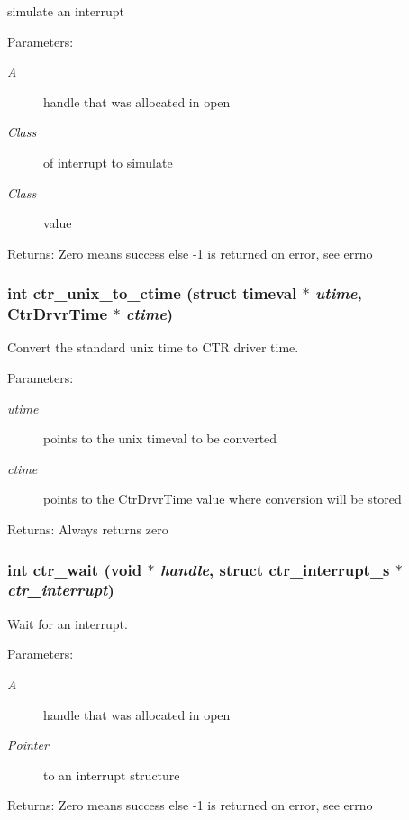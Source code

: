 simulate an interrupt 

\begin{Desc}
\item[Parameters:]
\begin{description}
\item[{\em A}]handle that was allocated in open \item[{\em Class}]of interrupt to simulate \item[{\em Class}]value \end{description}
\end{Desc}
\begin{Desc}
\item[Returns:]Zero means success else -1 is returned on error, see errno \end{Desc}
\subsubsection{\setlength{\rightskip}{0pt plus 5cm}int ctr\_\-unix\_\-to\_\-ctime (struct timeval $\ast$ {\em utime}, Ctr\-Drvr\-Time $\ast$ {\em ctime})}\label{libctr_8doxygen_4cd6c08e06ea1c80a47755499b22a18c}


Convert the standard unix time to CTR driver time. 

\begin{Desc}
\item[Parameters:]
\begin{description}
\item[{\em utime}]points to the unix timeval to be converted \item[{\em ctime}]points to the Ctr\-Drvr\-Time value where conversion will be stored \end{description}
\end{Desc}
\begin{Desc}
\item[Returns:]Always returns zero \end{Desc}
\subsubsection{\setlength{\rightskip}{0pt plus 5cm}int ctr\_\-wait (void $\ast$ {\em handle}, struct \bf{ctr\_\-interrupt\_\-s} $\ast$ {\em ctr\_\-interrupt})}\label{libctr_8doxygen_365202e6572dcba9c093375361a6a3da}


Wait for an interrupt. 

\begin{Desc}
\item[Parameters:]
\begin{description}
\item[{\em A}]handle that was allocated in open \item[{\em Pointer}]to an interrupt structure \end{description}
\end{Desc}
\begin{Desc}
\item[Returns:]Zero means success else -1 is returned on error, see errno \end{Desc}
